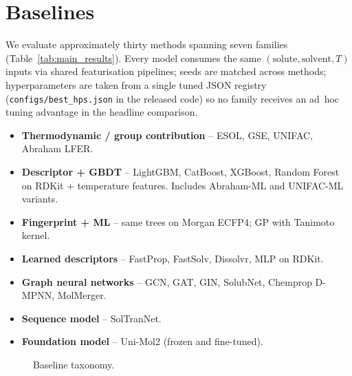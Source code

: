 \section{Baselines}
\label{sec:baselines}

We evaluate approximately thirty methods spanning seven families (Table~\ref{tab:main_results}).
Every model consumes the same $(\text{solute},\text{solvent},T)$ inputs via shared featurisation pipelines; seeds are matched across methods; hyperparameters are taken from a single tuned JSON registry (\texttt{configs/best\_hps.json} in the released code) so no family receives an ad~hoc tuning advantage in the headline comparison.

\begin{itemize}[leftmargin=*]
  \item \textbf{Thermodynamic / group contribution} -- ESOL, GSE,
        UNIFAC, Abraham LFER.
  \item \textbf{Descriptor + GBDT} -- LightGBM, CatBoost, XGBoost,
        Random Forest on RDKit + temperature features.  Includes
        Abraham-ML and UNIFAC-ML variants.
  \item \textbf{Fingerprint + ML} -- same trees on Morgan ECFP4; GP
        with Tanimoto kernel.
  \item \textbf{Learned descriptors} -- FastProp, FastSolv, Dissolvr,
        MLP on RDKit.
  \item \textbf{Graph neural networks} -- GCN, GAT, GIN, SolubNet,
        Chemprop D-MPNN, MolMerger.
  \item \textbf{Sequence model} -- SolTranNet.
  \item \textbf{Foundation model} -- Uni-Mol2 (frozen and fine-tuned).
\end{itemize}

\begin{figure}[h]
\centering
{}
\caption{Baseline taxonomy.}
\label{fig:family_tree}
\end{figure}
